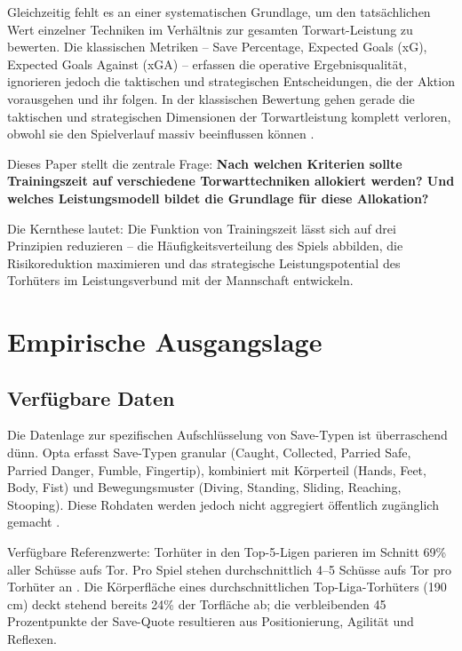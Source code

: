 \documentclass[12pt,a4paper]{article}
\begin{document}
Gleichzeitig fehlt es an einer systematischen Grundlage, um den tats\"achlichen Wert einzelner Techniken im Verh\"altnis zur gesamten Torwart-Leistung zu bewerten. Die klassischen Metriken -- Save Percentage, Expected Goals (xG), Expected Goals Against (xGA) -- erfassen die operative Ergebnisqualit\"at, ignorieren jedoch die taktischen und strategischen Entscheidungen, die der Aktion vorausgehen und ihr folgen. In der klassischen Bewertung gehen gerade die taktischen und strategischen Dimensionen der Torwartleistung komplett verloren, obwohl sie den Spielverlauf massiv beeinflussen k\"onnen \citep{tigges2026}.

Dieses Paper stellt die zentrale Frage: \textbf{Nach welchen Kriterien sollte Trainingszeit auf verschiedene Torwarttechniken allokiert werden? Und welches Leistungsmodell bildet die Grundlage f\"ur diese Allokation?}

Die Kernthese lautet: Die Funktion von Trainingszeit l\"asst sich auf drei Prinzipien reduzieren -- die H\"aufigkeitsverteilung des Spiels abbilden, die Risikoreduktion maximieren und das strategische Leistungspotential des Torh\"uters im Leistungsverbund mit der Mannschaft entwickeln.


\section{Empirische Ausgangslage}
\label{sec:empirie}

\subsection{Verf\"ugbare Daten}
\label{sec:daten}

Die Datenlage zur spezifischen Aufschl\"usselung von Save-Typen ist \"uberraschend d\"unn. Opta erfasst Save-Typen granular (Caught, Collected, Parried Safe, Parried Danger, Fumble, Fingertip), kombiniert mit K\"orperteil (Hands, Feet, Body, Fist) und Bewegungsmuster (Diving, Standing, Sliding, Reaching, Stooping). Diese Rohdaten werden jedoch nicht aggregiert \"offentlich zug\"anglich gemacht \citep{opta2024}.

Verf\"ugbare Referenzwerte: Torh\"uter in den Top-5-Ligen parieren im Schnitt 69\% aller Sch\"usse aufs Tor. Pro Spiel stehen durchschnittlich 4--5 Sch\"usse aufs Tor pro Torh\"uter an \citep{soccerment2024}. Die K\"orperfl\"ache eines durchschnittlichen Top-Liga-Torh\"uters (190\,cm) deckt stehend bereits 24\% der Torfl\"ache ab; die verbleibenden 45 Prozentpunkte der Save-Quote resultieren aus Positionierung, Agilit\"at und Reflexen.
\end{document}

